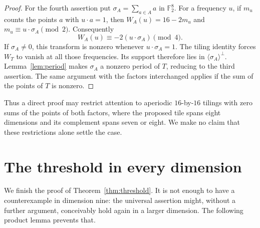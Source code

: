 \documentclass[11pt]{article}
\numberwithin{equation}{section}
\theoremstyle{definition}
\theoremstyle{remark}\newtheorem{remark}[theorem]{Remark}
\newcommand{\F}{\mathbb F_2}
\begin{document}
\begin{proof}
For the fourth assertion put $\sigma_A=\sum_{a\in A}a$ in $\F^8$.
For a frequency $u$, if $m_u$ counts the points $a$ with $u\cdot a=1$,
then $W_A(u)=16-2m_u$ and $m_u\equiv u\cdot\sigma_A\pmod2$.
Consequently
\[
 W_A(u)\equiv-2(u\cdot\sigma_A)\pmod4.
\]
If $\sigma_A\ne0$, this transform is nonzero whenever
$u\cdot\sigma_A=1$. The tiling identity forces $W_T$ to vanish at
all those frequencies. Its support therefore lies in
$\langle\sigma_A\rangle^\perp$. Lemma~\ref{lem:period} makes
$\sigma_A$ a nonzero period of $T$, reducing to the third assertion.
The same argument with the factors interchanged applies if the sum of
the points of $T$ is nonzero.
\end{proof}
Thus a direct proof may restrict attention to aperiodic $16$-by-$16$
tilings with zero sums of the points of both factors, where the proposed
tile spans eight dimensions and its complement spans seven or eight.
We make no claim that these restrictions alone settle the case.


\section{The threshold in every dimension}\label{sec:lifting}
We finish the proof of Theorem~\ref{thm:threshold}. It is not enough to
have a counterexample in dimension nine: the universal assertion might,
without a further argument, conceivably hold again in a larger dimension.
The following product lemma prevents that.
\end{document}
